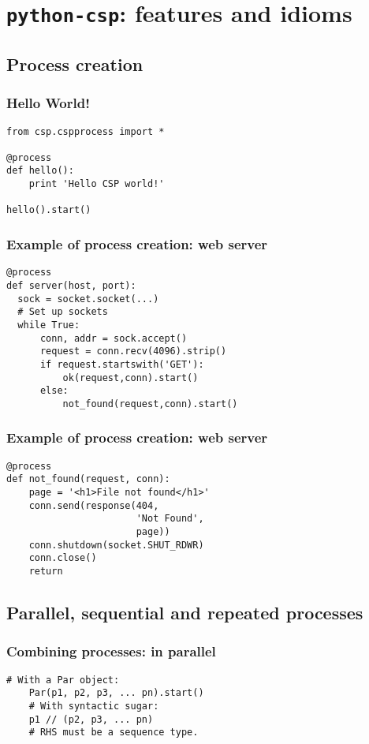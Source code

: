 \documentclass{beamer}
\newcommand{\pythoncsp}{\texttt{python-csp}}
\begin{document}
\section{\pythoncsp{}: features and idioms}

\subsection{Process creation}

\begin{frame}[fragile]
  \frametitle{Hello World!}
  \begin{lstlisting}[language=python_new]
from csp.cspprocess import * 

@process
def hello():
    print 'Hello CSP world!'

hello().start()
  \end{lstlisting}
\end{frame}



\begin{frame}[fragile]
  \frametitle{Example of process creation: web server}
  \begin{lstlisting}[language=python_new]
@process
def server(host, port):
  sock = socket.socket(...)
  # Set up sockets
  while True:
      conn, addr = sock.accept()
      request = conn.recv(4096).strip()
      if request.startswith('GET'):
          ok(request,conn).start()
      else:
          not_found(request,conn).start()
  \end{lstlisting}
\end{frame}


\begin{frame}[fragile]
  \frametitle{Example of process creation: web server}
  \begin{lstlisting}[language=python_new]
@process
def not_found(request, conn):
    page = '<h1>File not found</h1>'
    conn.send(response(404, 
                       'Not Found', 
                       page))
    conn.shutdown(socket.SHUT_RDWR)
    conn.close()
    return
  \end{lstlisting}
\end{frame}


\subsection{Parallel, sequential and repeated processes}

\begin{frame}[fragile]
  \frametitle{Combining processes: in parallel}
  \begin{lstlisting}[language=python_new]
    # With a Par object:
    Par(p1, p2, p3, ... pn).start()
    # With syntactic sugar:
    p1 // (p2, p3, ... pn)
    # RHS must be a sequence type.
  \end{lstlisting}
\end{frame}
\end{document}
